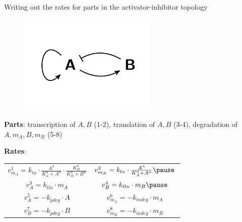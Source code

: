 \documentclass[handout]{beamer} %
\newcommand{\br}{\vspace{\baselineskip}}
\begin{document}
\begin{frame}{Writing out the rates for parts in the activator-inhibitor topology}
\begin{figure}
    \includegraphics[scale=1, clip=true, trim=0 0.9cm 0 1cm]{hasty_diagram.pdf}
\end{figure}

\textbf{Parts}:  transcription of $A, B$ (1-2), translation of $A, B$ (3-4), degradation of $A, m_A, B, m_B$ (5-8)

\br

\textbf{Rates}:

\centering
\begin{tabular}{cc}
	$v_{m_A}^1 = k_{tx} \cdot \frac{A^n}{K_A^n + A^n} \cdot \frac{K_B^n}{K_B^n + B^n}$ \pause & $v_{m_B}^2 = k_{tx} \cdot \frac{A^n}{K_A^n + A^n} \pause $\\
	$v_A^3 = k_{tln} \cdot m_A $ & $v_B^4 = k_{tln} \cdot m_B \pause $\\
	$v_A^5 = - k_{pdeg} \cdot A$ & $v_{m_A}^6 = - k_{mdeg} \cdot m_A $ \\
	$v_B^7 = - k_{pdeg} \cdot B$ & $v_{m_B}^8 = - k_{mdeg} \cdot m_B $ \\
\end{tabular}

\end{frame}
\end{document}
